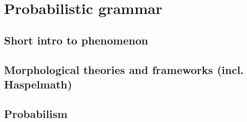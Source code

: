 \section{Probabilistic grammar}
\label{sec:probabilisticgrammar}

\subsection{Short intro to phenomenon}

\subsection{Morphological theories and frameworks (incl. Haspelmath)}

\subsection{Probabilism}


